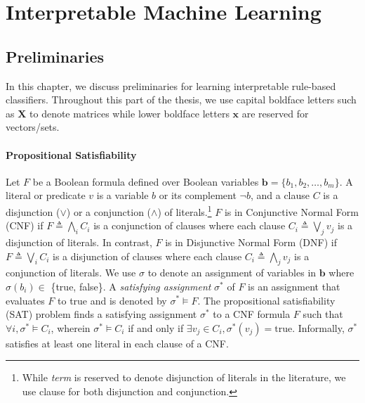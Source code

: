 \part{Interpretable Machine Learning}

\chapter{Preliminaries}


In this chapter, we discuss preliminaries for learning interpretable rule-based classifiers. Throughout this part of the thesis, we use capital  boldface letters such as $\mathbf{X}$ to denote matrices while lower boldface letters $\mathbf{x}$ are reserved for vectors/sets. 

\subsection*{Propositional Satisfiability}

Let $F$ be a Boolean formula defined over Boolean variables $\mathbf{b} = \{b_1,b_2,\dots ,b_m \}$. A literal or predicate $ v $ is a variable $b$ or its complement $\neg b$, and a clause $ C $ is a disjunction ($ \vee $) or a conjunction ($ \wedge $) of literals.\footnote{While \emph{term} is reserved to denote disjunction of literals in the literature, we use clause for both disjunction and conjunction.}  $F$ is in Conjunctive Normal Form (CNF) if $F \triangleq  \bigwedge_i C_i$ is a conjunction of clauses where each clause $C_i \triangleq  \bigvee_j v_j $  is a disjunction of literals. In contrast, $ F $ is in Disjunctive Normal Form (DNF) if $F \triangleq  \bigvee_i C_i$ is a disjunction of clauses where each clause $C_i \triangleq  \bigwedge_j v_j $ is a conjunction of literals. We use $\sigma$ to denote an assignment of variables in  $\mathbf{b}$ where $ \sigma(b_i) \in $ \{true, false\}. A \emph{satisfying assignment} $ \sigma^* $ of $F$ is an assignment  that evaluates $F$  to true and is denoted by $ \sigma^* \models F $. The propositional satisfiability (SAT) problem finds a satisfying assignment $ \sigma^* $ to a CNF formula $ F $  such that $ \forall i, \sigma^* \models C_i $, wherein $ \sigma^*\models C_i $ if and only if $ \exists v_j \in C_i, \sigma^*(v_j) = \text{true} $. Informally, $ \sigma^* $ satisfies at least one literal in each clause of a CNF. 


